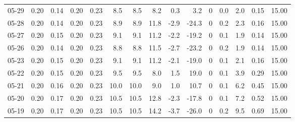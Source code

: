 \begin{threeparttable}
{\begin{tabular}{lrrrrrrrrrrrrrr}
  05-29 &          0.20 &          0.14 &          0.20 &        0.23 &                 8.5 &                8.5 &                 8.2 &        0.3 &          3.2 &              0 &                 0.0 &              2.0 &            0.15 &                  15.00 \\
  05-28 &          0.20 &          0.14 &          0.20 &        0.23 &                 8.9 &                8.9 &                11.8 &       -2.9 &        -24.3 &              0 &                 0.2 &              2.3 &            0.16 &                  15.00 \\
  05-27 &          0.20 &          0.15 &          0.20 &        0.23 &                 9.1 &                9.1 &                11.2 &       -2.2 &        -19.2 &              0 &                 0.1 &              1.9 &            0.14 &                  15.00 \\
  05-26 &          0.20 &          0.14 &          0.20 &        0.23 &                 8.8 &                8.8 &                11.5 &       -2.7 &        -23.2 &              0 &                 0.2 &              1.9 &            0.14 &                  15.00 \\
  05-23 &          0.20 &          0.15 &          0.20 &        0.23 &                 9.1 &                9.1 &                11.2 &       -2.1 &        -19.0 &              0 &                 0.1 &              2.1 &            0.16 &                  15.00 \\
  05-22 &          0.20 &          0.15 &          0.20 &        0.23 &                 9.5 &                9.5 &                 8.0 &        1.5 &         19.0 &              0 &                 0.1 &              3.9 &            0.29 &                  15.00 \\
  05-21 &          0.20 &          0.16 &          0.20 &        0.23 &                10.0 &               10.0 &                 9.0 &        1.0 &         10.7 &              0 &                 0.1 &              6.2 &            0.45 &                  15.00 \\
  05-20 &          0.20 &          0.17 &          0.20 &        0.23 &                10.5 &               10.5 &                12.8 &       -2.3 &        -17.8 &              0 &                 0.1 &              7.2 &            0.52 &                  15.00 \\
  05-19 &          0.20 &          0.17 &          0.20 &        0.23 &                10.5 &               10.5 &                14.2 &       -3.7 &        -26.0 &              0 &                 0.2 &              9.5 &            0.69 &                  15.00 \\

\end{tabular}}
\end{threeparttable}
